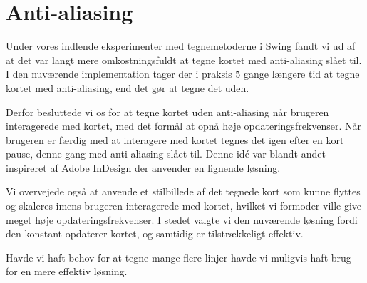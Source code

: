 \section{Anti-aliasing}

Under vores indlende eksperimenter med tegnemetoderne i Swing fandt vi ud af at det var langt mere omkostningsfuldt at tegne kortet med anti-aliasing slået til. I den nuværende implementation tager der i praksis \~5 gange længere tid at tegne kortet med anti-aliasing, end det gør at tegne det uden.

Derfor besluttede vi os for at tegne kortet uden anti-aliasing når brugeren interagerede med kortet, med det formål at opnå høje opdateringsfrekvenser. Når brugeren er færdig med at interagere med kortet tegnes det igen efter en kort pause, denne gang med anti-aliasing slået til. Denne idé var blandt andet inspireret af Adobe InDesign der anvender en lignende løsning.

Vi overvejede også at anvende et stilbillede af det tegnede kort som kunne flyttes og skaleres imens brugeren interagerede med kortet, hvilket vi formoder ville give meget høje opdateringsfrekvenser. I stedet valgte vi den nuværende løsning fordi den konstant opdaterer kortet, og samtidig er tilstrækkeligt effektiv.

Havde vi haft behov for at tegne mange flere linjer havde vi muligvis haft brug for en mere effektiv løsning.